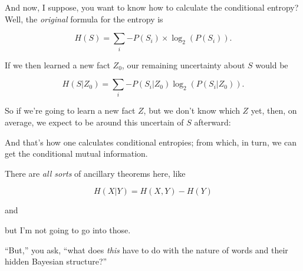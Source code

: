 { And now, I suppose, you want to know how to calculate the
conditional entropy? Well, the \textit{original} formula for the
entropy is

\begin{equation*}
 H(S) = \sum_{i}{-P(S_{i}) \times \log_{2}(P(S_{i}))}.
\end{equation*}



 If we then learned a new fact $Z_{0}$, our remaining
uncertainty about $S$ would be

\begin{equation*}
 H(S|Z_0) =\sum_{i}{-P(S_{i}|Z_{0})\log_{2}(P(S_{i}|Z_{0}))}.
\end{equation*}


 So if we're going to learn a new fact $Z$, but we
don't know which $Z$ yet, then, on average, we expect to
be around this uncertain of $S$ afterward:



 And that's how one calculates conditional
entropies; from which, in turn, we can get the conditional mutual
information. 


 There are \textit{all sorts} of ancillary theorems here, like

\begin{equation*}
 H(X|Y) = H (X,Y) - H(Y)
\end{equation*}



 and



 but I'm not going to go into those. 


 ``But,'' you ask,
``what does \textit{this} have to do with the nature
of words and their hidden Bayesian structure?''


}
